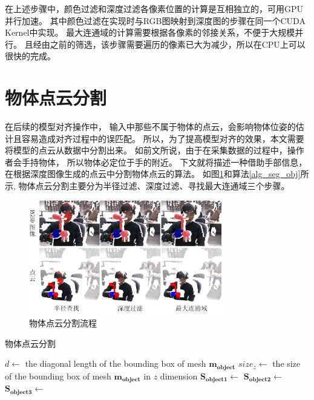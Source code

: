 在上述步骤中，颜色过滤和深度过滤各像素位置的计算是互相独立的，可用GPU并行加速。
其中颜色过滤在实现时与RGB图映射到深度图的步骤在同一个CUDA Kernel中实现。
最大连通域的计算需要根据各像素的邻接关系，不便于大规模并行。
且经由之前的筛选，该步骤需要遍历的像素已大为减少，所以在CPU上可以很快的完成。


\section{物体点云分割}
在后续的模型对齐操作中，
输入中那些不属于物体的点云，会影响物体位姿的估计且容易造成对齐过程中的误匹配。
所以，为了提高模型对齐的效果，本文需要将模型的点云从数据中分割出来。
如前文所说，由于在采集数据的过程中，操作者会手持物体，
所以物体必定位于手的附近。
下文就将描述一种借助手部信息，在根据深度图像生成的点云中分割物体点云的算法。
如图\ref{finding_object}和算法\ref{alg_seg_obj}所示,
物体点云分割主要分为半径过滤、深度过滤、寻找最大连通域三个步骤。
\begin{figure}[ht]
    \centering
    \includegraphics[width = 0.75\textwidth]{./Pictures/FindingObj.png}
    \caption{物体点云分割流程}
    \label{finding_object}
\end{figure}
\begin{algorithm}
    \caption{物体点云分割}
    \label{alg_seg_obj}
    \begin{algorithmic}[1]
            \State $d \gets$ the diagonal length of the bounding box of mesh $\bm{m_{object}}$
            \State $size_z \gets$ the size of the bounding box of mesh $\bm{m_{object}}$ in $z$ dimension
            \State $\bm{S_{object1}} \gets$ 
            \State $\bm{S_{object2}} \gets$ 
            \State $\bm{S_{object3}} \gets$ 
        \EndProcedure
    \end{algorithmic}
\end{algorithm} 


